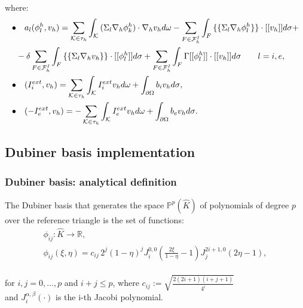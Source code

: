 \documentclass[8pt]{beamer}
\begin{document}
\begin{frame}
	where:
	\center
	\begin{equation*}
	\begin{aligned}
	\bullet& \quad a_l(\phi_l^h,v_h)=\sum_{\mathcal{K} \in \tau_h} \int_{\mathcal{K}}{(\Sigma_l \nabla_h \phi_k^h) \cdot \nabla_h v_h d\omega}-\sum_{F \in \mathcal{F}_h^I} \int_F { \{\{\Sigma_l \nabla_h \phi_l^h \}\} \cdot [[v_h]] d\sigma}+\\
	&-\delta \sum_{F \in \mathcal{F}_h^I} \int_F{ \{\{\Sigma_l \nabla_h v_h\}\} \cdot [[\phi_l^h]]d\sigma}+\sum_{F \in \mathcal{F}_h^I}\int_F {\Gamma [[\phi_l^h]] \cdot [[v_h]] d\sigma} \qquad l=i,e,\\
	\newline
	\bullet& \quad (I_i^{ext},v_h)=\sum_{\mathcal{K} \in \tau_h} \int_{\mathcal{K}} {I_i^{ext} v_h d\omega}+\int_{\partial \Omega}{b_i v_h d\sigma},\\
	\newline
	\bullet& \quad (-I_e^{ext},v_h)=-\sum_{\mathcal{K} \in \tau_h} \int_{\mathcal{K}} {I_e^{ext} v_h d\omega}+\int_{\partial \Omega}{b_e v_h d\sigma}.
	\end{aligned}
	\end{equation*}
\end{frame}

\subsection{Dubiner basis implementation}

\begin{frame}
\frametitle{Dubiner basis: analytical definition}
\begin{definition} \label{dubiner}
	The Dubiner basis that generates the space $\mathbb{P}^p(\hat{K})$ of polynomials of degree $p$ over the reference triangle is the set of functions:
	\begin{equation*}
	\begin{gathered}
	 \phi_{ij}: \hat{K} \rightarrow \mathbb{R}, \\
	\phi_{ij}(\xi,\eta) =c_{ij} \, 2^j (1-\eta)^j J_i^{0,0}(\frac{2\xi}{1-\eta}-1) J_j^{2i+1,0} (2\eta-1),
	\end{gathered}
	\end{equation*}
	\vspace{2mm} \\
	\center
	for $i,j=0,\dots,p$ and $i+j \le p$, where $c_{ij} := \sqrt{\frac{2(2i+1)(i+j+1)}{4^i}}$ \\
	and $J_i^{\alpha,\beta}(\cdot)$ is the i-th Jacobi polynomial.
\end{definition}
\end{frame}
\end{document}

